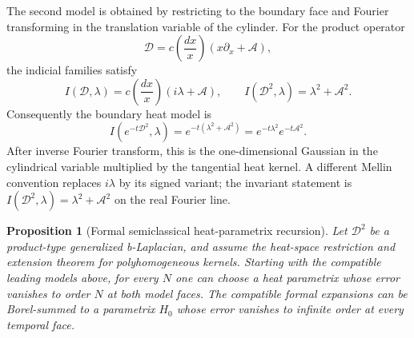 \documentclass[12pt,oneside,reqno]{article}
\theoremstyle{plain}
\newtheorem{proposition}[theorem]{Proposition}
\theoremstyle{definition}
\theoremstyle{remark}
\begin{document}
The second model is obtained by restricting to the boundary face and
Fourier transforming in the translation variable of the cylinder.  For
the product operator
\[
 \mathcal D
 =c\!\left(\frac{dx}{x}\right)(x\partial_x+\mathcal A),
\]
the indicial families satisfy
\begin{equation}\label{eq:semiclassical-boundary-model}
 I(\mathcal D,\lambda)
 =c\!\left(\frac{dx}{x}\right)(i\lambda+\mathcal A),
 \qquad
 I(\mathcal D^2,\lambda)=\lambda^2+\mathcal A^2.
\end{equation}
Consequently the boundary heat model is
\begin{equation}\label{eq:boundary-heat-family}
 I(e^{-t\mathcal D^2},\lambda)
 =e^{-t(\lambda^2+\mathcal A^2)}
 =e^{-t\lambda^2}e^{-t\mathcal A^2}.
\end{equation}
After inverse Fourier transform, this is the one-dimensional Gaussian in
the cylindrical variable multiplied by the tangential heat kernel.  A
different Mellin convention replaces \(i\lambda\) by its signed variant;
the invariant statement is
\(I(\mathcal D^2,\lambda)=\lambda^2+\mathcal A^2\) on the real Fourier
line.

\begin{proposition}[Formal semiclassical heat-parametrix recursion]
Let \(\mathcal D^2\) be a product-type generalized b-Laplacian, and assume
the heat-space restriction and extension theorem for polyhomogeneous
kernels.  Starting with the compatible leading models above, for every
\(N\) one can choose a heat parametrix whose error vanishes to order \(N\)
at both model faces.  The compatible formal expansions can be
Borel-summed to a parametrix \(H_0\) whose error vanishes to infinite order
at every temporal face.
\end{proposition}
\end{document}
